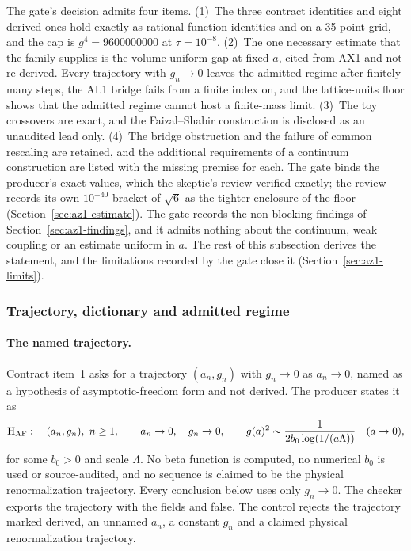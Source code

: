 The gate's decision admits four items. (1)~The three contract identities and
eight derived ones hold exactly as rational-function identities and on a
35-point grid, and the cap is $g^4=9600000000$ at $\tau=10^{-8}$. (2)~The one
necessary estimate that the family supplies is the volume-uniform gap at
fixed $a$, cited from AX1 and not re-derived. Every trajectory with
$g_n\to0$ leaves the admitted regime after finitely many steps, the AL1
bridge fails from a finite index on, and the lattice-units floor shows that
the admitted regime cannot host a finite-mass limit. (3)~The toy crossovers
are exact, and the Faizal--Shabir construction is disclosed as an unaudited
lead only. (4)~The bridge obstruction and the failure of common rescaling are
retained, and the additional requirements of a continuum construction are
listed with the missing premise for each. The gate binds the producer's exact
values, which the skeptic's review verified exactly; the review records its
own $10^{-40}$ bracket of $\sqrt6$ as the tighter enclosure of the floor
(Section~\ref{sec:az1-estimate}). The gate records the non-blocking findings
of Section~\ref{sec:az1-findings}, and it admits nothing about the continuum,
weak coupling or an estimate uniform in $a$. The rest of this subsection
derives the statement, and the limitations recorded by the gate close it
(Section~\ref{sec:az1-limits}).

\subsubsection{Trajectory, dictionary and admitted regime}
\label{sec:az1-dictionary}
\paragraph{The named trajectory.}
Contract item~1 asks for a trajectory $(a_n,g_n)$ with $g_n\to0$ as
$a_n\to0$, named as a hypothesis of asymptotic-freedom form and not derived.
The producer states it as
\begin{equation}
 \mathrm{H}_{\rm AF}:\quad(a_n,g_n),\ n\ge1,\qquad a_n\to0,\quad g_n\to0,\qquad
 g(a)^2\sim\frac1{2b_0\log(1/(a\Lambda))}\quad(a\to0),
 \label{eq:az1-trajectory}
\end{equation}
for some $b_0>0$ and scale $\Lambda$. No beta function is computed, no
numerical $b_0$ is used or source-audited, and no sequence is claimed to be
the physical renormalization trajectory. Every conclusion below uses only
$g_n\to0$. The checker exports the trajectory with the fields
 and  false. The control
 rejects the trajectory marked derived, an unnamed
$a_n$, a constant $g_n$ and a claimed physical renormalization trajectory.


